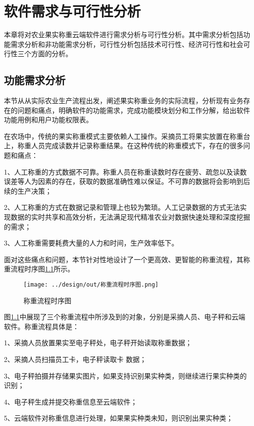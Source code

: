 \chapter{软件需求与可行性分析}

本章将对农业果实称重云端软件进行需求分析与可行性分析。其中需求分析包括功能需求分析和非功能需求分析，可行性分析包括技术可行性、经济可行性和社会可行性三个方面的分析。

\section{功能需求分析}\label{sec:req1}

本节从从实际农业生产流程出发，阐述果实称重业务的实际流程，分析现有业务存在的问题和痛点，明确软件的功能需求，完成功能模块划分和工作分解，给出软件功能用例和用户功能权限表。

在农场中，传统的果实称重模式主要依赖人工操作。采摘员工将果实放置在称重台上，称重人员完成读数并记录称重结果。在这种传统的称重模式下，存在的很多问题和痛点：

1、人工称重的方式数据不可靠。称重人员在称重读数时存在疲劳、疏忽以及读数误差等人为因素的存在，获取的数据准确性难以保证。不可靠的数据将会影响到后续的生产决策；

2、人工称重的方式在数据记录和管理上也较为繁琐。人工记录数据的方式无法实现数据的实时共享和高效分析，无法满足现代精准农业对数据快速处理和深度挖掘的需求；

3、人工称重需要耗费大量的人力和时间，生产效率低下。

面对这些痛点和问题，本节针对性地设计了一个更高效、更智能的称重流程，其称重流程时序图\ref{fig:称重流程时序图}所示。

\begin{figure}[H]
    \centering
    \texttt{[image: ../design/out/称重流程时序图.png]}
    \caption{称重流程时序图}
    \label{fig:称重流程时序图}
\end{figure}

图\ref{fig:称重流程时序图}中展现了三个称重流程中所涉及到的对象，分别是采摘人员、电子秤和云端软件。称重流程具体是：

1、采摘人员放置果实至电子秤处，电子秤开始读取称重数据；

2、采摘人员扫描员工卡，电子秤读取卡
数据；

3、电子秤拍摄并存储果实图片，如果支持识别果实种类，则继续进行果实种类的识别；

4、电子秤生成并提交称重信息至云端软件；

5、云端软件对称重信息进行处理，如果果实种类未知，则识别出果实种类；

